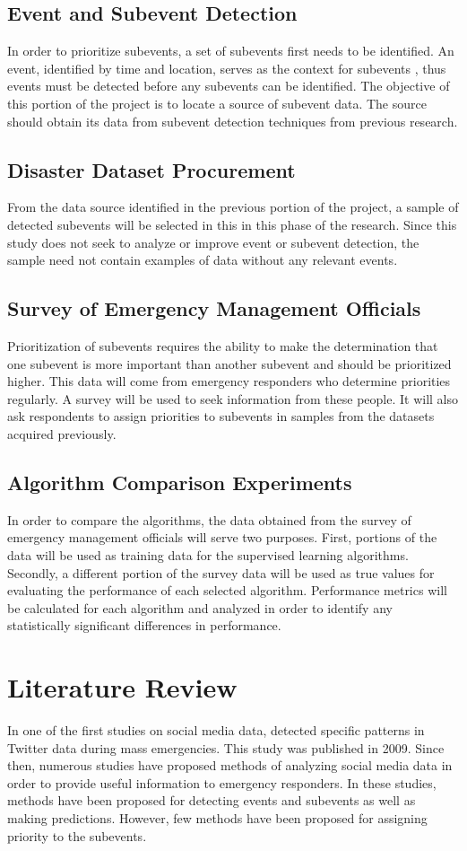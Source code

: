 \documentclass[conference]{IEEEtran}
\begin{document}
\subsection{Event and Subevent Detection}
In order to prioritize subevents, a set of subevents first needs to be identified. An event, identified by time and location, serves as the context for subevents \cite{Pohl}, thus events must be detected before any subevents can be identified. The objective of this portion of the project is to locate a source of subevent data. The source should obtain its data from subevent detection techniques from previous research.
\subsection{Disaster Dataset Procurement}
From the data source identified in the previous portion of the project, a sample of detected subevents will be selected in this in this phase of the research. Since this study does not seek to analyze or improve event or subevent detection, the sample need not contain examples of data without any relevant events.
\subsection{Survey of Emergency Management Officials}
Prioritization of subevents requires the ability to make the determination that one subevent is more important than another subevent and should be prioritized higher. This data will come from emergency responders who determine priorities regularly. A survey will be used to seek information from these people. It will also ask respondents to assign priorities to subevents in samples from the datasets acquired previously.
\subsection{Algorithm Comparison Experiments}
In order to compare the algorithms, the data obtained from the survey of emergency management officials will serve two purposes. First, portions of the data will be used as training data for the supervised learning algorithms. Secondly, a different portion of the survey data will be used as true values for evaluating the performance of each selected algorithm. Performance metrics will be calculated for each algorithm and analyzed in order to identify any statistically significant differences in performance.


\section{Literature Review}
In one of the first studies on social media data, \cite{hughes2009twitter} detected specific patterns in Twitter data during mass emergencies. This study was published in 2009. Since then, numerous studies have proposed methods of analyzing social media data in order to provide useful information to emergency responders. In these studies, methods have been proposed for detecting events and subevents as well as making predictions. However, few methods have been proposed for assigning priority to the subevents.
\end{document}
